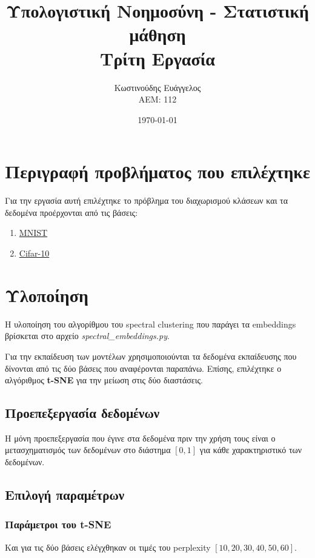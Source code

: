 \documentclass[a4paper]{article}
\title{Υπολογιστική Νοημοσύνη - Στατιστική μάθηση \\ Τρίτη Εργασία}
\author{Κωστινούδης Ευάγγελος \\ΑΕΜ: 112}
\date{\today}
\begin{document}
\maketitle
{}
\newpage
{}

\section{Περιγραφή προβλήματος που επιλέχτηκε}

Για την εργασία αυτή επιλέχτηκε το πρόβλημα του διαχωρισμού κλάσεων και τα
δεδομένα προέρχονται από τις βάσεις:

\begin{enumerate}
\item \href{http://yann.lecun.com/exdb/mnist/}{MNIST}
\item \href{https://www.cs.toronto.edu/~kriz/cifar.html}{Cifar-10}
\end{enumerate}


\section{Υλοποίηση}

Η υλοποίηση του αλγορίθμου του spectral clustering που παράγει τα embeddings
βρίσκεται στο αρχείο \textit{spectral\_embeddings.py}.

Για την εκπαίδευση των μοντέλων χρησιμοποιούνται τα δεδομένα εκπαίδευσης που
δίνονται από τις δύο βάσεις που αναφέρονται παραπάνω. Επίσης, επιλέχτηκε ο
αλγόριθμος \textbf{t-SNE} για την μείωση στις δύο διαστάσεις.

\subsection{Προεπεξεργασία δεδομένων}

Η μόνη προεπεξεργασία που έγινε στα δεδομένα πριν την χρήση τους είναι ο
μετασχηματισμός των δεδομένων στο διάστημα $[0,1]$ για κάθε χαρακτηριστικό των
δεδομένων.

\subsection{Επιλογή παραμέτρων}
\subsubsection{Παράμετροι του t-SNE}

Και για τις δύο βάσεις ελέγχθηκαν οι τιμές του perplexity $[10, 20, 30, 40, 50,
60]$.
\end{document}
